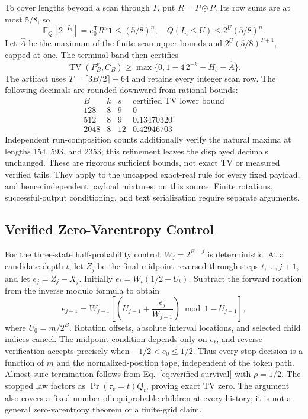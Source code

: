 To cover lengths beyond a scan through $T$, put $R=P\odot P$. Its row sums
are at most $5/8$, so
\[
 \mathbb E_Q[2^{-I_n}]=e_0^{\mathsf T}R^n\mathbf1\le(5/8)^n,\quad
 Q(I_n\le U)\le2^U(5/8)^n.
\]
Let $\widehat A$ be the maximum of the finite-scan upper bounds and
$2^U(5/8)^{T+1}$, capped at one. The terminal band then certifies
\begin{equation}
 \operatorname{TV}(P_B^{v},C_B)
 \ge\max\{0,1-4\,2^{-k}-H_s-\widehat A\}.
 \label{eq:finite-verified-certificate}
\end{equation}
The artifact uses $T=\lceil3B/2\rceil+64$ and retains every integer scan row.
The following decimals are rounded downward from rational bounds:
\[
 \begin{array}{rrrr}
 B&k&s&\text{certified TV lower bound}\\
 128&8&9&0\\
 512&8&9&0.13470320\\
 2048&8&12&0.42946703
 \end{array}
\]
Independent run-composition counts additionally verify the natural maxima
at lengths 154, 593, and 2353; this refinement leaves the displayed decimals
unchanged. These are rigorous sufficient bounds, not exact TV or measured
verified tails. They apply to the uncapped exact-real rule for every fixed
payload, and hence independent payload mixtures, on this source. Finite
rotations, successful-output conditioning, and text serialization require
separate arguments.

\subsection{Verified Zero-Varentropy Control}
\label{app:verified-zero}

For the three-state half-probability control, $W_j=2^{B-j}$ is deterministic.
At a candidate depth $t$, let $Z_j$ be the final midpoint reversed through
steps $t,\ldots,j+1$, and let $e_j=Z_j-X_j$. Initially
$e_t=W_t(1/2-U_t)$. Subtract the forward rotation from the inverse modulo
formula to obtain
\begin{equation}
 e_{j-1}=W_{j-1}\left[
 \left(U_{j-1}+\frac{e_j}{W_{j-1}}\right)\bmod1-U_{j-1}\right],
 \label{eq:reverse-error}
\end{equation}
where $U_0=m/2^B$. Rotation offsets, absolute interval locations, and selected
child indices cancel. The midpoint condition depends only on $e_t$, and
reverse verification accepts precisely when $-1/2<e_0\le1/2$. Thus every stop
decision is a function of $m$ and the normalized-position tape, independent of
the token path. Almost-sure termination follows from
Eq.~\eqref{eq:verified-survival} with $\rho=1/2$. The stopped law factors as
$\Pr(\tau_v=t)Q_t$, proving exact TV zero. The argument also covers a fixed
number of equiprobable children at every history; it is not a general
zero-varentropy theorem or a finite-grid claim.

